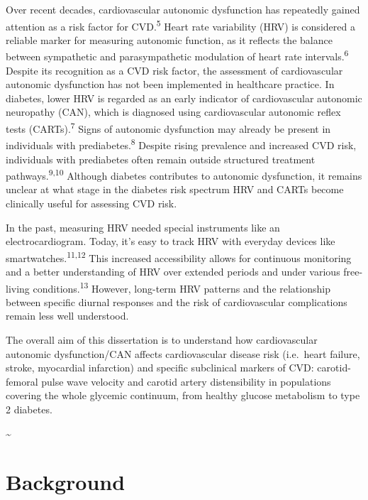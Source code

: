 \documentclass[
  a4paper,
  headsepline=true,
  open=any]{scrbook}
\begin{document}
Over recent decades, cardiovascular autonomic dysfunction has repeatedly
gained attention as a risk factor for CVD.\textsuperscript{5} Heart rate
variability (HRV) is considered a reliable marker for measuring
autonomic function, as it reflects the balance between sympathetic and
parasympathetic modulation of heart rate intervals.\textsuperscript{6}
Despite its recognition as a CVD risk factor, the assessment of
cardiovascular autonomic dysfunction has not been implemented in
healthcare practice. In diabetes, lower HRV is regarded as an early
indicator of cardiovascular autonomic neuropathy (CAN), which is
diagnosed using cardiovascular autonomic reflex tests
(CARTs).\textsuperscript{7} Signs of autonomic dysfunction may already
be present in individuals with prediabetes.\textsuperscript{8} Despite
rising prevalence and increased CVD risk, individuals with prediabetes
often remain outside structured treatment
pathways.\textsuperscript{9,10} Although diabetes contributes to
autonomic dysfunction, it remains unclear at what stage in the diabetes
risk spectrum HRV and CARTs become clinically useful for assessing CVD
risk.

In the past, measuring HRV needed special instruments like an
electrocardiogram. Today, it's easy to track HRV with everyday devices
like smartwatches.\textsuperscript{11,12} This increased accessibility
allows for continuous monitoring and a better understanding of HRV over
extended periods and under various free-living
conditions.\textsuperscript{13} However, long-term HRV patterns and the
relationship between specific diurnal responses and the risk of
cardiovascular complications remain less well understood.

The overall aim of this dissertation is to understand how cardiovascular
autonomic dysfunction/CAN affects cardiovascular disease risk
(i.e.~heart failure, stroke, myocardial infarction) and specific
subclinical markers of CVD: carotid-femoral pulse wave velocity and
carotid artery distensibility in populations covering the whole glycemic
continuum, from healthy glucose metabolism to type 2 diabetes.

\newpage

\thispagestyle{empty}

\textasciitilde{} \newpage


\hypertarget{background}{%
\chapter{Background}\label{background}}
\end{document}
